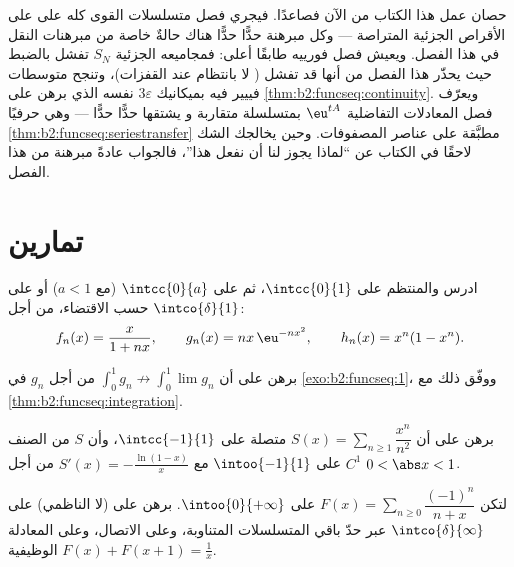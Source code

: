 \begin{remark}
 حصان عمل هذا الكتاب من الآن فصاعدًا. فيجري
فصل متسلسلات القوى كله على  على
الأقراص الجزئية المتراصة --- وكل مبرهنة حدًّا حدًّا هناك
حالةٌ خاصة من مبرهنات النقل في هذا الفصل. ويعيش فصل
فورييه طابقًا أعلى: فمجاميعه الجزئية $S_N$ تفشل
بالضبط حيث يحذّر هذا الفصل من أنها قد تفشل ( لا
بانتظام عند القفزات)، وتنجح متوسطات فييير فيه بميكانيك
$3\varepsilon$ نفسه الذي برهن على
\cref{thm:b2:funcseq:continuity}. ويعرّف فصل المعادلات
التفاضلية $\eu^{tA}$ بمتسلسلة متقاربة  و
يشتقها حدًّا حدًّا --- وهي حرفيًا
\cref{thm:b2:funcseq:seriestransfer} مطبَّقة على عناصر
المصفوفات. وحين يخالجك الشك لاحقًا في الكتاب عن ``لماذا يجوز لنا
أن نفعل هذا''، فالجواب عادةً مبرهنة من هذا الفصل.
\end{remark}

\section{تمارين}

\begin{exercise}[$\star$]\label{exo:b2:funcseq:1}
ادرس  والمنتظم على $\intcc{0}{1}$، ثم
على $\intcc{0}{a}$ (مع $a < 1$) أو على $\intco{\delta}{1}$ حسب الاقتضاء، من أجل:
\[
f_n(x) = \frac{x}{1 + nx},
\qquad
g_n(x) = n x\,\eu^{-n x^2},
\qquad
h_n(x) = x^n(1 - x^n).
\]
\end{exercise}

\begin{exercise}[$\star$]\label{exo:b2:funcseq:2}
برهن على أن $\displaystyle\int_0^1 g_n \not\to \int_0^1 \lim g_n$
من أجل $g_n$ في \cref{exo:b2:funcseq:1}، ووفّق ذلك مع
\cref{thm:b2:funcseq:integration}.
\end{exercise}

\begin{exercise}[$\star$]\label{exo:b2:funcseq:3}
برهن على أن $S(x) = \sum_{n\geq1} \dfrac{x^n}{n^2}$ متصلة على
$\intcc{-1}{1}$، وأن $S$ من الصنف $C^1$ على $\intoo{-1}{1}$ مع
$S'(x) = -\frac{\ln(1-x)}{x}$ من أجل $0 < \abs x < 1$.
\end{exercise}

\begin{exercise}[$\star\star$]\label{exo:b2:funcseq:4}
لتكن $F(x) = \sum_{n \geq 0} \dfrac{(-1)^n}{n + x}$ على
$\intoo{0}{+\infty}$. برهن على  (لا الناظمي) على
$\intco{\delta}{\infty}$ عبر حدّ باقي المتسلسلات
المتناوبة، وعلى الاتصال، وعلى المعادلة الوظيفية $F(x) + F(x + 1) =
\frac1x$.
\end{exercise}

